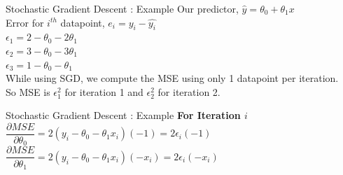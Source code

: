 \documentclass[usenames,dvipsnames]{beamer}
\begin{document}
                        \begin{frame}{Stochastic Gradient Descent : Example}
                        Our predictor, $\hat{y} = \theta_0 + \theta_1x$\\
                        \vspace{1cm}
                        Error for $i^{th}$ datapoint, $e_i = y_i - \hat{y_i}$\\
                        
                        $\epsilon_1 = 2 - \theta_0 - 2\theta_1$ \\
                        $\epsilon_2 = 3 - \theta_0 - 3\theta_1$ \\
                        $\epsilon_3 = 1 - \theta_0 - \theta_1$ \\
                        
                        \vspace{1cm}
                        While using SGD, we compute the MSE using only 1 datapoint per iteration. \\
                        So MSE is $\epsilon_1^2$ for iteration 1 and $\epsilon_2^2$ for iteration 2.
                        \end{frame}
                        
                        
                        \begin{frame}{Stochastic Gradient Descent : Example}
                        \textbf{For Iteration $i$}\\
                        \vspace{1cm}
                        $\dfrac{\partial MSE}{\partial \theta_0} = 2\left( y_i - \theta_0 -\theta_1x_i \right)\left(-1\right) = 2\epsilon_i\left(-1\right)$ \\
                        \vspace{2cm}
                        $\dfrac{\partial MSE}{\partial \theta_1} = 2\left( y_i - \theta_0 -\theta_1x_i \right)\left(-x_i\right) = 2\epsilon_i\left(-x_i\right)$ 
                        \end{frame}
                        
\end{document}
